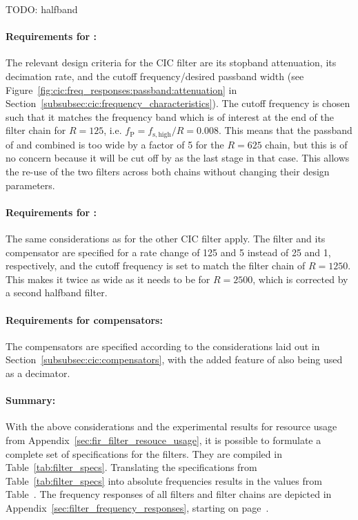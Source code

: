 TODO: halfband

\paragraph{Requirements     for     :} The     relevant     design
criteria    for   the    CIC    filter   are    its   stopband    attenuation,
its   decimation    rate,   and   the   cutoff    frequency/desired   passband
width    (see   Figure~\ref{fig:cic:freq_responses:passband:attenuation}    in
Section~\ref{subsubsec:cic:frequency_characteristics}).  The  cutoff frequency
is chosen such that it matches the  frequency band which is of interest at the
end of the filter chain  for $R=125$, i.e. $f_\mathrm{P} = f_\mathrm{s,high}/R
=  0.008$. This means  that  the passband  of   and  
combined is too wide by a factor of \num{5} for the $R=625$ chain, but this is
of no concern because it will be cut  off by  as the last stage in
that  case. This allows  the  re-use of  the two  filters  across both  chains
without changing their design parameters.

\paragraph{Requirements for :} The same considerations as for the
other CIC  filter apply. The filter  and its  compensator are specified  for a
rate  change  of  \num{125}  and  \num{5} instead  of  \num{25}  and  \num{1},
respectively, and  the cutoff frequency  is set to  match the filter  chain of
$R=1250$. This makes it twice as wide as it needs to be for $R=2500$, which is
corrected by a second halfband filter.

\paragraph{Requirements     for     compensators:} The    compensators     are
specified     according    to     the    considerations     laid    out     in
Section~\ref{subsubsec:cic:compensators},   with   the    added   feature   of
 also being used as a decimator.

\paragraph{Summary:} With  the  above   considerations  and  the  experimental
results for  resource usage  from Appendix~\ref{sec:fir_filter_resouce_usage},
it  is  possible  to  formulate  a complete  set  of  specifications  for  the
filters. They  are  compiled   in  Table~\ref{tab:filter_specs}.   Translating
the   specifications    from   Table~\ref{tab:filter_specs}    into   absolute
frequencies  results  in   the  values  from  Table~\label{tab:tb_widths}. The
frequency    responses    of   all    filters    and    filter   chains    are
depicted   in   Appendix~\ref{sec:filter_frequency_responses},   starting   on
page~\pageref{sec:filter_frequency_responses}.

